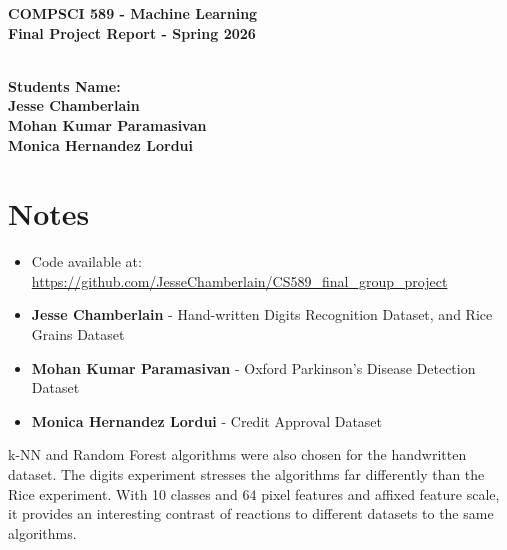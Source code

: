 \documentclass{article}
\newcommand{\POINTS}[1]{\textcolor{purple}{\textbf{{#1}}}}
\begin{document}
\newpage
\vspace*{1cm}
\begin{center}
    \begin{Large}
    {\Huge \textbf{COMPSCI 589 - Machine Learning}}\\
    \vspace{0.2cm}
    {\Huge \textbf{Final Project Report - Spring 2026}}
    \end{Large}
    \\
    \vspace{1.00cm}
        {\LARGE \textbf{Students Name:}}\\
        \vspace{0.60cm}
        {\LARGE \textbf{Jesse Chamberlain}}\\
        \vspace{0.45cm}
        {\LARGE \textbf{Mohan Kumar Paramasivan}}\\
        \vspace{0.45cm}
        {\LARGE \textbf{Monica Hernandez Lordui}}
        \vspace{0.45cm}
\end{center}

\vspace{0.5cm}
\section*{Notes}
\vspace{0.5cm}

\begin{itemize}
    \item Code available at: \url{https://github.com/JesseChamberlain/CS589_final_group_project}
    \item \textbf{Jesse Chamberlain} - Hand-written Digits Recognition Dataset, and Rice Grains Dataset
    \item \textbf{Mohan Kumar Paramasivan} - Oxford Parkinson’s Disease Detection Dataset
    \item \textbf{Monica Hernandez Lordui} - Credit Approval Dataset
\end{itemize}
\vspace{0.8cm}
 \POINTS{}

\vspace{0.45in}
\vspace{0.5cm}
\noindent k-NN and Random Forest algorithms were also chosen for the handwritten dataset. The digits experiment stresses the algorithms far differently than the Rice experiment. With 10 classes and 64 pixel features and affixed feature scale, it provides an interesting contrast of reactions to different datasets to the same algorithms.
\vspace{0.5cm}
\end{document}
